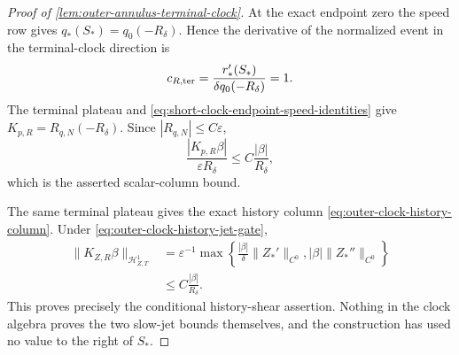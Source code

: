\begin{proof}[Proof of \cref{lem:outer-annulus-terminal-clock}]
At the exact endpoint zero the speed row gives
\(q_*(S_*)=q_0(-R_\delta)\).  Hence the derivative of the normalized
event in the terminal-clock direction is
\[
 c_{R,\rm ter}
 =\frac{r_*'(S_*)}{\delta q_0(-R_\delta)}=1.
\]
The terminal plateau and
\cref{eq:short-clock-endpoint-speed-identities} give
\(K_{p,R}=R_{q,N}(-R_\delta)\).  Since
\(|R_{q,N}|\le C\varepsilon\),
\[
 \frac{|K_{p,R}\beta|}{\varepsilon R_\delta}
 \le C\frac{|\beta|}{R_\delta},
\]
which is the asserted scalar-column bound.

The same terminal plateau gives the exact history column
\cref{eq:outer-clock-history-column}.  Under
\cref{eq:outer-clock-history-jet-gate},
\begin{align*}
 \|K_{Z,R}\beta\|_{\mathcal H_{Z,T}^1}
 &=\varepsilon^{-1}
   \max\left\{
      \frac{|\beta|}{\delta}\|Z_*'\|_{C^0},
      |\beta|\|Z_*''\|_{C^0}\right\}\\
 &\le C\frac{|\beta|}{R_\delta}.
\end{align*}
This proves precisely the conditional history-shear assertion.  Nothing
in the clock algebra proves the two slow-jet bounds themselves, and the
construction has used no value to the right of \(S_*\).
\end{proof}

